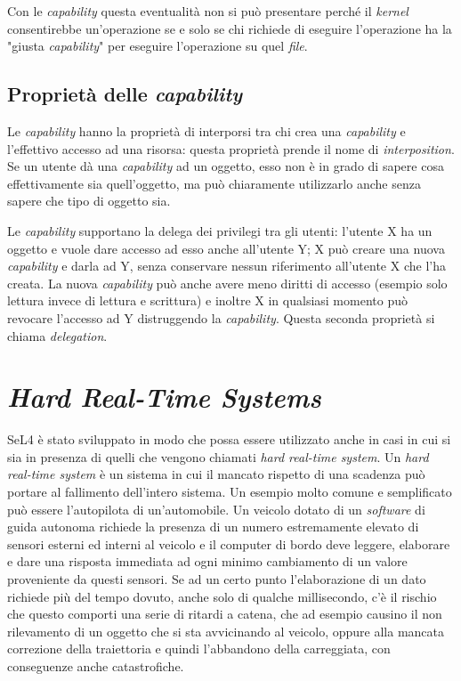 Con le \textit{capability} questa eventualità non si può presentare perché il \textit{kernel} consentirebbe un'operazione se e solo se chi richiede di eseguire l'operazione ha la "giusta \textit{capability}" per eseguire l'operazione su quel \textit{file}. 

\subsection{Proprietà delle \textit{capability}}
Le \textit{capability} hanno la proprietà di interporsi tra chi crea una \textit{capability} e l'effettivo accesso ad una risorsa: questa proprietà prende il nome di \textit{interposition}. Se un utente dà una \textit{capability} ad un oggetto, esso non è in grado di sapere cosa effettivamente sia quell'oggetto, ma può chiaramente utilizzarlo anche senza sapere che tipo di oggetto sia.

Le \textit{capability} supportano la delega dei privilegi tra gli utenti: l'utente X ha un oggetto e vuole dare accesso ad esso anche all'utente Y; X può creare una nuova \textit{capability} e darla ad Y, senza conservare nessun riferimento all'utente X che l'ha creata. La nuova \textit{capability} può anche avere meno diritti di accesso (esempio solo lettura invece di lettura e scrittura) e inoltre X in qualsiasi momento può revocare l'accesso ad Y distruggendo la \textit{capability}. Questa seconda proprietà si chiama \textit{delegation}.

\section{\textit{Hard Real-Time Systems}}
SeL4 è stato sviluppato in modo che possa essere utilizzato anche in casi in cui si sia in presenza di quelli che vengono chiamati \textit{hard real-time system}.
Un \textit{hard real-time system} è un sistema in cui il mancato rispetto di una scadenza può portare al fallimento dell'intero sistema. Un esempio molto comune e semplificato può essere l'autopilota di un'automobile. Un veicolo dotato di un \textit{software} di guida autonoma richiede la presenza di un numero estremamente elevato di sensori esterni ed interni al veicolo e il computer di bordo deve leggere, elaborare e dare una risposta immediata ad ogni minimo cambiamento di un valore proveniente da questi sensori. Se ad un certo punto l'elaborazione di un dato richiede più del tempo dovuto, anche solo di qualche millisecondo, c'è il rischio che questo comporti una serie  di ritardi a catena, che ad esempio causino il non rilevamento di un oggetto che si sta avvicinando al veicolo, oppure alla mancata correzione della traiettoria e quindi l'abbandono della carreggiata, con conseguenze anche catastrofiche.

